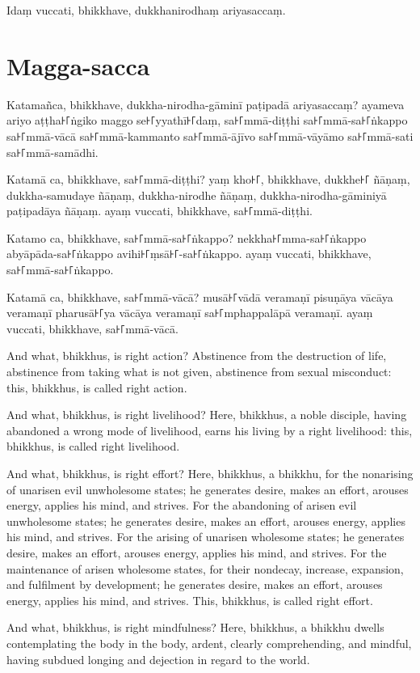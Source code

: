Idaṃ vuccati, bhikkhave, dukkhanirodhaṃ ariyasaccaṃ.

\section*{Magga-sacca}

Katamañca, bhikkhave, dukkha-nirodha-gāminī paṭipadā ariyasaccaṃ? ayameva ariyo
aṭṭha꜔꜒ṅgiko maggo se꜔꜒yyathī꜔꜒daṃ, sa꜔꜒mmā-diṭṭhi sa꜔꜒mmā-sa꜔꜒ṅkappo sa꜔꜒mmā-vācā
sa꜔꜒mmā-kammanto sa꜔꜒mmā-ājīvo sa꜔꜒mmā-vāyāmo sa꜔꜒mmā-sati sa꜔꜒mmā-samādhi.

Katamā ca, bhikkhave, sa꜔꜒mmā-diṭṭhi? yaṃ kho꜔꜒, bhikkhave, dukkhe꜔꜒ ñāṇaṃ,
dukkha-samudaye ñāṇaṃ, dukkha-nirodhe ñāṇaṃ, dukkha-nirodha-gāminiyā paṭipadāya
ñāṇaṃ. ayaṃ vuccati, bhikkhave, sa꜔꜒mmā-diṭṭhi.

Katamo ca, bhikkhave, sa꜔꜒mmā-sa꜔꜒ṅkappo? nekkha꜔꜒mma-sa꜔꜒ṅkappo abyāpāda-sa꜔꜒ṅkappo
avihi꜔꜒ṃsā꜔꜒-sa꜔꜒ṅkappo. ayaṃ vuccati, bhikkhave, sa꜔꜒mmā-sa꜔꜒ṅkappo.

Katamā ca, bhikkhave, sa꜔꜒mmā-vācā? musā꜔꜒vādā veramaṇī pisuṇāya vācāya veramaṇī
pharusā꜔꜒ya vācāya veramaṇī sa꜔꜒mphappalāpā veramaṇī. ayaṃ vuccati, bhikkhave,
sa꜔꜒mmā-vācā.

\englishPage

And what, bhikkhus, is right action? Abstinence from the destruction of life,
abstinence from taking what is not given, abstinence from sexual misconduct:
this, bhikkhus, is called right action.

And what, bhikkhus, is right livelihood? Here, bhikkhus, a noble disciple,
having abandoned a wrong mode of livelihood, earns his living by a right
livelihood: this, bhikkhus, is called right livelihood.

And what, bhikkhus, is right effort? Here, bhikkhus, a bhikkhu, for the
nonarising of unarisen evil unwholesome states; he generates desire, makes an
effort, arouses energy, applies his mind, and strives. For the abandoning of
arisen evil unwholesome states; he generates desire, makes an effort, arouses
energy, applies his mind, and strives. For the arising of unarisen wholesome
states; he generates desire, makes an effort, arouses energy, applies his mind,
and strives. For the maintenance of arisen wholesome states, for their nondecay,
increase, expansion, and fulfilment by development; he generates desire, makes
an effort, arouses energy, applies his mind, and strives. This, bhikkhus, is
called right effort.

And what, bhikkhus, is right mindfulness? Here, bhikkhus, a bhikkhu dwells
contemplating the body in the body, ardent, clearly comprehending, and mindful,
having subdued longing and dejection in regard to the world.

